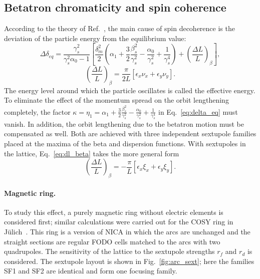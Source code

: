 \subsection{Betatron chromaticity and spin coherence}

According to the theory of Ref.~\cite{Melnikov:2023_jetpl_decoherence}, the main cause of
spin decoherence is the deviation of the particle energy from the equilibrium
value:
\begin{equation}
  \Delta\delta_{eq} = \frac{\gamma_s^2}{\gamma_s^2\alpha_0-1}
  \left[\frac{\delta_m^2}{2}\left(\alpha_1+\frac{3}{2}\frac{\beta_s^2}{\gamma_s^2}
  -\frac{\alpha_0}{\gamma_s^2}+\frac{1}{\gamma_s^4}\right)
  + \left(\frac{\Delta L}{L}\right)_\beta\right],
  \label{eq:delta_eq}
\end{equation}
\begin{equation}
  \left(\frac{\Delta L}{L}\right)_\beta = \frac{\pi}{2L}\left[\epsilon_x\nu_x+\epsilon_y\nu_y\right].
  \label{eq:dl_beta}
\end{equation}
The energy level around which the particle oscillates is called the effective
energy. To eliminate the effect of the momentum spread on the orbit
lengthening completely, the factor
$\kappa = \eta_1 = \alpha_1+\frac{3}{2}\frac{\beta_s^2}{\gamma_s^2}
-\frac{\alpha_0}{\gamma_s^2}+\frac{1}{\gamma_s^4}$
in Eq.~\eqref{eq:delta_eq} must vanish. In addition, the orbit lengthening
due to the betatron motion must be compensated as well. Both are achieved with
three independent sextupole families placed at the maxima of the beta and
dispersion functions. With sextupoles in the lattice, Eq.~\eqref{eq:dl_beta}
takes the more general form~\cite{Melnikov:2022xao}
\begin{equation}
  \left(\frac{\Delta L}{L}\right)_\beta = -\frac{\pi}{L}\left[\epsilon_x\xi_x+\epsilon_y\xi_y\right].
  \label{eq:dl_beta_sext}
\end{equation}

\paragraph{Magnetic ring.}
To study this effect, a purely magnetic ring without electric elements is
considered first; similar calculations were carried out for the COSY ring in
J\"ulich~\cite{Melnikov:2022xao}. This ring is a version of NICA in which the
arcs are unchanged and the straight sections are regular FODO cells matched to
the arcs with two quadrupoles. The sensitivity of the lattice to the sextupole
strengths $r_f$ and $r_d$ is considered. The sextupole layout is shown in
Fig.~\ref{fig:arc_sext}; here the families SF1 and SF2 are identical and form
one focusing family.

